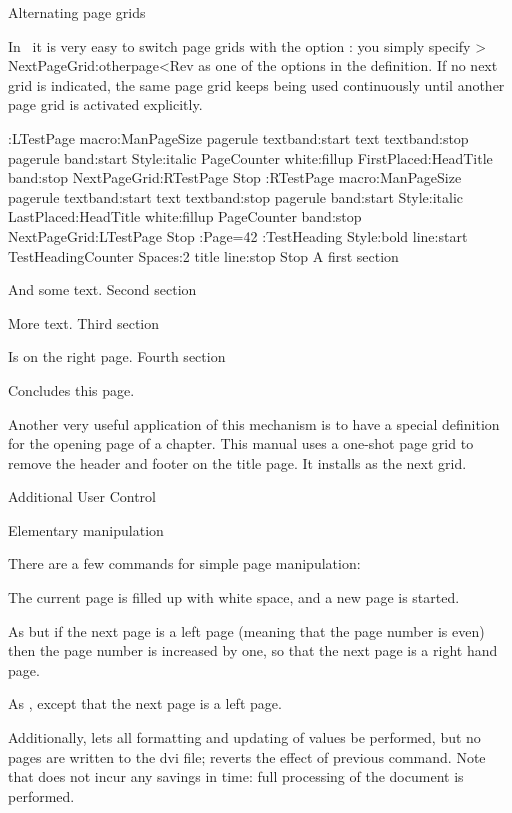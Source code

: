 \Section Alternating page grids

In \Lollipop\ it is very easy to switch page grids with the option
: you simply specify
 \Ver>    NextPageGrid:otherpage<Rev as one of the options
in the definition. If no next grid is indicated, the same page grid keeps
being used continuously until another page grid is activated
explicitly.

\OutExample
\DefinePageGrid:LTestPage macro:ManPageSize
 pagerule textband:start text textband:stop pagerule 
 band:start Style:italic
     PageCounter white:fillup FirstPlaced:HeadTitle   
     band:stop NextPageGrid:RTestPage Stop
\DefinePageGrid:RTestPage macro:ManPageSize
 pagerule textband:start text textband:stop pagerule 
 band:start Style:italic 
     LastPlaced:HeadTitle white:fillup PageCounter
     band:stop NextPageGrid:LTestPage Stop
\SetCounter:Page=42
\DefineHeading:TestHeading Style:bold 
 line:start TestHeadingCounter Spaces:2 title line:stop Stop
\LTestPage
\TestHeading A first section\par And some text.
\TestHeading Second section\par More text.\EjectPage
\TestHeading Third section\par Is on the right page.
\TestHeading Fourth section\par Concludes this page.
\OutExampleStop

Another very useful application of this mechanism is to have a
special definition for the opening page of a chapter. This manual uses a
one-shot page grid  to remove the header and footer on the
title page. It installs  as the next grid.

\Section Additional User Control

\SubSection Elementary manipulation

There are a few commands for simple page manipulation:
\Description\item {}
The current page is filled up with white space, and
a new page is started.\item {}
As  but if the next page is a left page (meaning
that the page number is even) then the page number is increased by
one, so that the next page is a right hand page.\item {}
As , except that the next page is a left page.
\>

Additionally,  lets
all formatting and updating of values be performed, but
no pages are written to the dvi file;
reverts the effect of previous command. Note that  does not
incur any savings in time: full processing of the document is performed.
 
